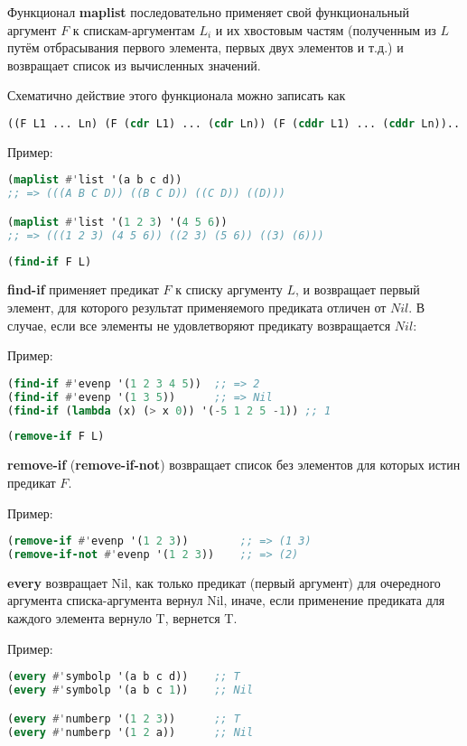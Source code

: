 \documentclass[a4paper,oneside,12pt]{extreport}
\begin{document}
Функционал \textbf{maplist} последовательно применяет свой функциональный
аргумент $F$ к спискам-аргументам $L_i$ и их хвостовым частям (полученным из
$L$ путём отбрасывания первого элемента, первых двух элементов и т.д.) и
возвращает список из вычисленных значений. 

Схематично действие этого функционала можно записать как
\begin{lstlisting}[language=Lisp] 
((F L1 ... Ln) (F (cdr L1) ... (cdr Ln)) (F (cddr L1) ... (cddr Ln))...)
\end{lstlisting}

Пример:
\begin{lstlisting}[language=Lisp] 
(maplist #'list '(a b c d)) 
;; => (((A B C D)) ((B C D)) ((C D)) ((D)))

(maplist #'list '(1 2 3) '(4 5 6))
;; => (((1 2 3) (4 5 6)) ((2 3) (5 6)) ((3) (6)))
\end{lstlisting}

\begin{lstlisting}[language=Lisp] 
(find-if F L)
\end{lstlisting}

\textbf{find-if} применяет предикат $F$ к списку аргументу $L$, 
и возвращает первый элемент, для которого результат применяемого предиката отличен от $Nil$.
В случае, если все элементы не удовлетворяют предикату возвращается $Nil$:

Пример:    
\begin{lstlisting}[language=Lisp] 
(find-if #'evenp '(1 2 3 4 5))  ;; => 2
(find-if #'evenp '(1 3 5))      ;; => Nil
(find-if (lambda (x) (> x 0)) '(-5 1 2 5 -1)) ;; 1
\end{lstlisting}

\begin{lstlisting}[language=Lisp] 
(remove-if F L)
\end{lstlisting}
\textbf{remove-if} (\textbf{remove-if-not}) возвращает список 
без элементов для которых истин предикат $F$.

Пример:
\begin{lstlisting}[language=Lisp] 
(remove-if #'evenp '(1 2 3))        ;; => (1 3)
(remove-if-not #'evenp '(1 2 3))    ;; => (2)
\end{lstlisting}

\textbf{every} возвращает Nil, как только предикат (первый аргумент) для очередного аргумента списка-аргумента вернул Nil, 
иначе, если применение предиката для каждого элемента вернуло T, вернется T.

Пример:
\begin{lstlisting}[language=Lisp] 
(every #'symbolp '(a b c d))    ;; T
(every #'symbolp '(a b c 1))    ;; Nil

(every #'numberp '(1 2 3))      ;; T
(every #'numberp '(1 2 a))      ;; Nil
\end{lstlisting}
\end{document}
